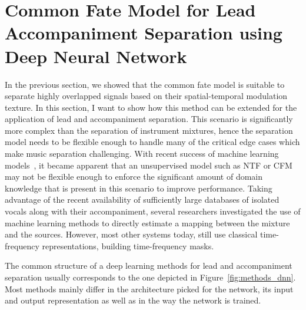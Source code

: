\section{Common Fate Model for Lead Accompaniment Separation using Deep Neural Network}%
\label{sec:cft_for_lead_accompaniment_separation}


In the previous section, we showed that the common fate model is suitable to separate highly overlapped signals based on their spatial-temporal modulation texture.
In this section, I want to show how this method can be extended for the application of lead and accompaniment separation.
This scenario is significantly more complex than the separation of instrument mixtures, hence the separation model needs to be flexible enough to handle many of the critical edge cases which make music separation challenging.
With recent success of machine learning models~\cite{HintonSpeech}, it became apparent that an unsupervised model such as NTF or CFM may not be flexible enough to enforce the significant amount of domain knowledge that is present in this scenario to improve performance.
Taking advantage of the recent availability of sufficiently large databases of isolated vocals along with their accompaniment, several researchers investigated the use of machine learning methods to directly estimate a mapping between the mixture and the sources.
However, most other systems today, still use classical time-frequency representations, building time-frequency masks.
\par
The common structure of a deep learning methods for lead and accompaniment separation usually corresponds to the one depicted in Figure~\ref{fig:methods_dnn}.
Most methods mainly differ in the architecture picked for the network, its input and output representation as well as in the way the network is trained.

